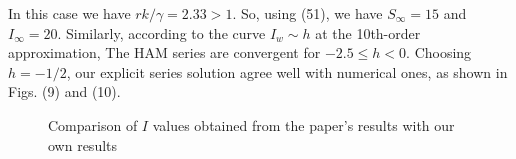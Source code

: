 \documentclass[10pt]{article}
\begin{document}
  In this case we have $r k / \gamma=2.33>1$. So, using (51), we have $S_{\infty}=15$ and $I_{\infty}=20$. Similarly, according to the curve $I_{w} \sim h$ at the 10th-order approximation, The HAM series are convergent for $-2.5 \leqslant h<0$. Choosing $h=-1 / 2$, our explicit series solution agree well with numerical ones, as shown in Figs. (9) and (10).\begin{figure}[htbp]
  \centering
  \hfill
  \caption{Comparison of \(I\) values obtained from the paper's results with our own results  }
  \end{figure}
\end{document}
